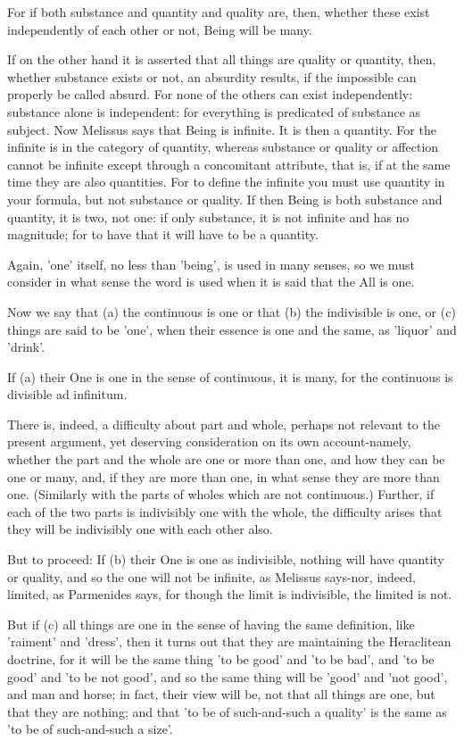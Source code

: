 For if both substance and quantity and quality are, then, whether
these exist independently of each other or not, Being will be many.

If on the other hand it is asserted that all things are quality or
quantity, then, whether substance exists or not, an absurdity results,
if the impossible can properly be called absurd. For none of the others
can exist independently: substance alone is independent: for everything
is predicated of substance as subject. Now Melissus says that Being
is infinite. It is then a quantity. For the infinite is in the category
of quantity, whereas substance or quality or affection cannot be infinite
except through a concomitant attribute, that is, if at the same time
they are also quantities. For to define the infinite you must use
quantity in your formula, but not substance or quality. If then Being
is both substance and quantity, it is two, not one: if only substance,
it is not infinite and has no magnitude; for to have that it will
have to be a quantity. 

Again, 'one' itself, no less than 'being', is used in many senses,
so we must consider in what sense the word is used when it is said
that the All is one. 

Now we say that (a) the continuous is one or that (b) the indivisible
is one, or (c) things are said to be 'one', when their essence is
one and the same, as 'liquor' and 'drink'. 

If (a) their One is one in the sense of continuous, it is many, for
the continuous is divisible ad infinitum. 

There is, indeed, a difficulty about part and whole, perhaps not relevant
to the present argument, yet deserving consideration on its own account-namely,
whether the part and the whole are one or more than one, and how they
can be one or many, and, if they are more than one, in what sense
they are more than one. (Similarly with the parts of wholes which
are not continuous.) Further, if each of the two parts is indivisibly
one with the whole, the difficulty arises that they will be indivisibly
one with each other also. 

But to proceed: If (b) their One is one as indivisible, nothing will
have quantity or quality, and so the one will not be infinite, as
Melissus says-nor, indeed, limited, as Parmenides says, for though
the limit is indivisible, the limited is not. 

But if (c) all things are one in the sense of having the same definition,
like 'raiment' and 'dress', then it turns out that they are maintaining
the Heraclitean doctrine, for it will be the same thing 'to be good'
and 'to be bad', and 'to be good' and 'to be not good', and so the
same thing will be 'good' and 'not good', and man and horse; in fact,
their view will be, not that all things are one, but that they are
nothing; and that 'to be of such-and-such a quality' is the same as
'to be of such-and-such a size'. 

